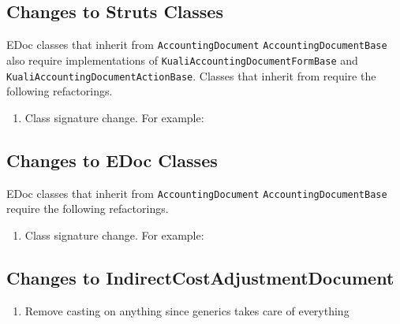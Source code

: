 \documentclass[12pt,notitlepage]{article}
\begin{document}
  \subsection{Changes to Struts Classes}
  EDoc classes that inherit from \verb|AccountingDocument| \verb|AccountingDocumentBase| also require implementations of
  \verb|KualiAccountingDocumentFormBase| and \verb|KualiAccountingDocumentActionBase|. Classes that inherit from require 
  the following refactorings. 
  \begin{enumerate}
    \item Class signature change. For example:
      
      
  \end{enumerate}
  \subsection{Changes to EDoc Classes}
  EDoc classes that inherit from \verb|AccountingDocument| \verb|AccountingDocumentBase| require the following refactorings.
  \begin{enumerate}
    \item Class signature change. For example:
      
  \end{enumerate}
  \subsection{Changes to IndirectCostAdjustmentDocument}
    \begin{enumerate}
    \item Remove casting on anything since generics takes care of everything
    \end{enumerate}
    
\end{document}
